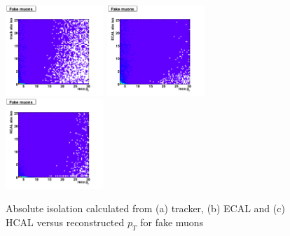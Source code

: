  \begin{figure}[htbp]
    \includegraphics[width = 0.33\textwidth]{pictures/recoPt_absIso/trackIso_muon_fake.png}
   \includegraphics[width = 0.33\textwidth]{pictures/recoPt_absIso/ecalIso_muon_fake.png}
    \includegraphics[width = 0.33\textwidth]{pictures/recoPt_absIso/hcalIso_muon_fake.png}
    \caption{Absolute isolation calculated from (a) tracker, (b) ECAL and (c) HCAL versus
       reconstructed $p_{T}$ for fake muons}
    \label{fig:FakeMuonRecoPt_AbsIso}
 \end{figure}

